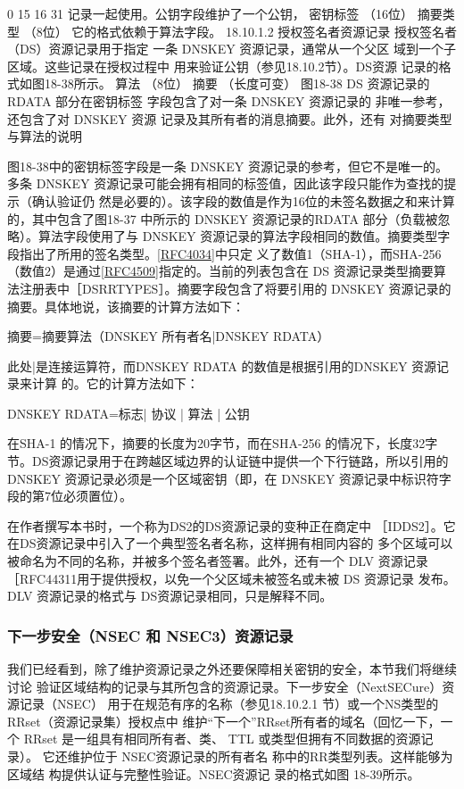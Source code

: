 0
15 16
31
记录一起使用。公钥字段维护了一个公钥，
密钥标签
（16位）
摘要类型
（8位）
它的格式依赖于算法字段。
18.10.1.2 授权签名者资源记录
授权签名者（DS）资源记录用于指定
一条 DNSKEY 资源记录，通常从一个父区
域到一个子区域。这些记录在授权过程中
用来验证公钥（参见18.10.2节）。DS资源
记录的格式如图18-38所示。
算法
（8位）
摘要
（长度可变）
图18-38
DS 资源记录的RDATA 部分在密钥标签
字段包含了对一条 DNSKEY 资源记录的
非唯一参考，还包含了对 DNSKEY 资源
记录及其所有者的消息摘要。此外，还有
对摘要类型与算法的说明

图18-38中的密钥标签字段是一条 DNSKEY 资源记录的参考，但它不是唯一的。多条
DNSKEY 资源记录可能会拥有相同的标签值，因此该字段只能作为查找的提示（确认验证仍
然是必要的）。该字段的数值是作为16位的未签名数据之和来计算的，其中包含了图18-37
中所示的 DNSKEY 资源记录的RDATA 部分（负载被忽略）。算法字段使用了与 DNSKEY
资源记录的算法字段相同的数值。摘要类型字段指出了所用的签名类型。\href{https://www.rfc-editor.org/rfc/rfc4034}{[RFC4034]}中只定
义了数值1（SHA-1），而SHA-256（数值2）是通过\href{https://www.rfc-editor.org/rfc/rfc4509}{[RFC4509]}指定的。当前的列表包含在
DS 资源记录类型摘要算法注册表中［DSRRTYPES］。摘要字段包含了将要引用的 DNSKEY
资源记录的摘要。具体地说，该摘要的计算方法如下：

摘要=摘要算法（DNSKEY 所有者名|DNSKEY RDATA）

此处|是连接运算符，而DNSKEY RDATA 的数值是根据引用的DNSKEY 资源记录来计算
的。它的计算方法如下：

DNSKEY RDATA=标志| 协议 | 算法 | 公钥

在SHA-1 的情况下，摘要的长度为20字节，而在SHA-256 的情况下，长度32字
节。DS资源记录用于在跨越区域边界的认证链中提供一个下行链路，所以引用的DNSKEY
资源记录必须是一个区域密钥（即，在 DNSKEY 资源记录中标识符字段的第7位必须置位）。
\begin{tcolorbox}
    在作者撰写本书时，一个称为DS2的DS资源记录的变种正在商定中
    ［IDDS2］。它在DS资源记录中引入了一个典型签名者名称，这样拥有相同内容的
    多个区域可以被命名为不同的名称，并被多个签名者签署。此外，还有一个 DLV
    资源记录［RFC44311用于提供授权，以免一个父区域未被签名或未被 DS 资源记录
    发布。DLV 资源记录的格式与 DS资源记录相同，只是解释不同。
\end{tcolorbox}

\subsubsection{下一步安全（NSEC 和 NSEC3）资源记录}

我们已经看到，除了维护资源记录之外还要保障相关密钥的安全，本节我们将继续讨论
验证区域结构的记录与其所包含的资源记录。下一步安全（NextSECure）资源记录（NSEC）
用于在规范有序的名称（参见18.10.2.1 节）或一个NS类型的RRset（资源记录集）授权点中
维护“下一个”RRset所有者的域名（回忆一下，一个 RRset 是一组具有相同所有者、类、
TTL 或类型但拥有不同数据的资源记录）。
它还维护位于 NSEC资源记录的所有者名
称中的RR类型列表。这样能够为区域结
构提供认证与完整性验证。NSEC资源记
录的格式如图 18-39所示。

